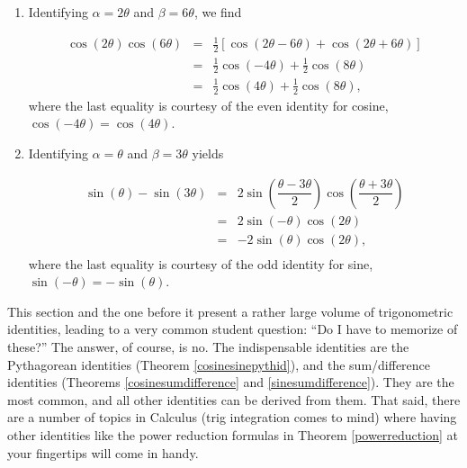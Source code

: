 \medskip

{\begin{enumerate}

\item  Identifying $\alpha = 2\theta$ and $\beta = 6\theta$, we find

\[\begin{array}{rcl}

\cos(2\theta)\cos(6\theta) & = &  \frac{1}{2} \left[ \cos(2\theta - 6\theta) + \cos(2\theta + 6\theta)\right]\\ [4pt]
													 & = & \frac{1}{2} \cos(-4\theta) + \frac{1}{2}\cos(8\theta) \\ [4pt]
													 & = & \frac{1}{2} \cos(4\theta) + \frac{1}{2} \cos(8\theta), \end{array} \]
where the last equality is courtesy of the even identity for cosine, $\cos(-4\theta) = \cos(4\theta)$.

\item  Identifying $\alpha = \theta$ and $\beta = 3\theta$ yields

\[ \begin{array}{rcl}

\sin(\theta) - \sin(3\theta) & = &  2 \sin\left( \dfrac{\theta - 3\theta}{2}\right)\cos\left( \dfrac{\theta + 3\theta}{2}\right) \\ [2pt]
														 & = &  2 \sin\left( -\theta \right)\cos\left( 2\theta \right) \\ [2pt]
															& = &  -2 \sin\left( \theta \right)\cos\left( 2\theta \right), \\ \end{array}\]
where the last equality is courtesy of the odd identity for sine, $\sin(-\theta) = -\sin(\theta)$.

\end{enumerate}}

\medskip

This section and the one before it present a rather large volume of trigonometric identities, leading to a very common student question: ``Do I have to memorize  of these?'' The answer, of course, is no. The indispensable identities are the Pythagorean identities (Theorem \ref{cosinesinepythid}), and the sum/difference identities (Theorems \ref{cosinesumdifference} and \ref{sinesumdifference}). They are the most common, and all other identities can be derived from them. That said, there are a number of topics in Calculus (trig integration comes to mind) where having other identities like the power reduction formulas in Theorem \ref{powerreduction} at your fingertips will come in handy.

